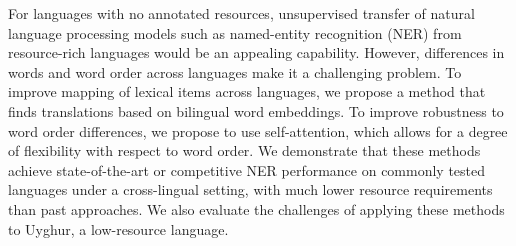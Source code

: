 For languages with no annotated resources, unsupervised transfer of natural language processing models such as named-entity recognition (NER) from resource-rich languages would be an appealing capability. However, differences in  words and word order across languages make it a challenging problem. To improve mapping of lexical items across languages, we propose a method that finds translations based on bilingual word embeddings. To improve robustness to word order differences, we propose to use self-attention, which allows for a degree of flexibility with respect to word order. We demonstrate that these methods achieve state-of-the-art or competitive NER performance on commonly tested languages under a cross-lingual setting, with much lower resource requirements than past approaches. We also evaluate the challenges of applying these methods to Uyghur, a low-resource language.
